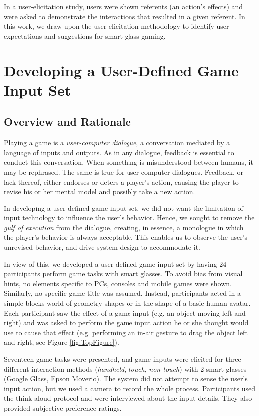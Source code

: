 \documentclass{sigchi}
\begin{document}
    In a user-elicitation study, users were shown referents (an action's effects) and were asked to demonstrate the interactions that resulted in a given referent\cite{Wobbrock:2009:UGS:1518701.1518866}. In this work, we draw upon the user-elicitation methodology to identify user expectations and suggestions for smart glass gaming.

\section{Developing a User-Defined Game Input Set}


    \subsection {Overview and Rationale}
    Playing a game is a \textsl{user-computer dialogue}\cite{userComputer}, a conversation mediated by a language of inputs and outputs. As in any dialogue, feedback is essential to conduct this conversation. When something is misunderstood between humans, it may be rephrased. The same is true for user-computer dialogues. Feedback, or lack thereof, either endorses or deters a player's action, causing the player to revise his or her mental model and possibly take a new action.

    In developing a user-defined game input set, we did not want the limitation of input technology to influence the user's behavior. Hence, we sought to remove the \textsl{gulf of execution}\cite{gulf} from the dialogue, creating, in essence, a monologue in which the player's behavior is always acceptable. This enables us to observe the user's unrevised behavior, and drive system design to accommodate it.

    In view of this, we developed a user-defined game input set by having 24 participants perform game tasks with smart glasses. To avoid bias from visual hints\cite{Epps:2006:SHS:1125451.1125601}, no elements specific to PCs, consoles and mobile games were shown. Similarly, no specific game title was assumed. Instead, participants acted in a simple blocks world of geometry shapes or in the shape of a basic human avatar. Each participant saw the effect of a game input (e.g. an object moving left and right) and was asked to perform the game input action he or she thought would use to cause that effect (e.g. performing an in-air gesture to drag the object left and right, see Figure \ref{fig:TopFigure}). 

    Seventeen game tasks were presented, and game inputs were elicited for three different interaction methods (\emph{handheld}, \emph{touch}, \emph{non-touch}) with 2 smart glasses (Google Glass, Epson Moverio). The system did not attempt to sense the user's input action, but we used a camera to record the whole process. Participants used the think-aloud protocol and were interviewed about the input details. They also provided subjective preference ratings.
\end{document}
